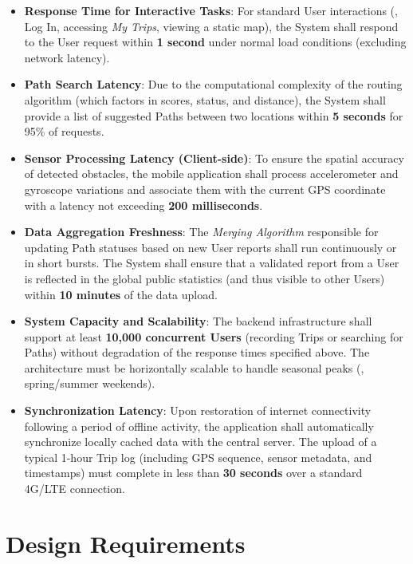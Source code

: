 \begin{itemize}
    \item \textbf{Response Time for Interactive Tasks}: 
    For standard User interactions (\eg, Log In, accessing \emph{My Trips}, viewing a static map), the System shall respond to the User request within \textbf{1 second} under normal load conditions (excluding network latency).

    \item \textbf{Path Search Latency}: 
    Due to the computational complexity of the routing algorithm (which factors in scores, status, and distance), the System shall provide a list of suggested Paths between two locations within \textbf{5 seconds} for 95\% of requests.

    \item \textbf{Sensor Processing Latency (Client-side)}: 
    To ensure the spatial accuracy of detected obstacles, the mobile application shall process accelerometer and gyroscope variations and associate them with the current GPS coordinate with a latency not exceeding \textbf{200 milliseconds}.

    \item \textbf{Data Aggregation Freshness}: 
    The \emph{Merging Algorithm} responsible for updating Path statuses based on new User reports shall run continuously or in short bursts. The System shall ensure that a validated report from a User is reflected in the global public statistics (and thus visible to other Users) within \textbf{10 minutes} of the data upload.

    \item \textbf{System Capacity and Scalability}: 
    The backend infrastructure shall support at least \textbf{10,000 concurrent Users} (recording Trips or searching for Paths) without degradation of the response times specified above. The architecture must be horizontally scalable to handle seasonal peaks (\eg, spring/summer weekends).

    \item \textbf{Synchronization Latency}: 
    Upon restoration of internet connectivity following a period of offline activity, the application shall automatically synchronize locally cached data with the central server. The upload of a typical 1-hour Trip log (including GPS sequence, sensor metadata, and timestamps) must complete in less than \textbf{30 seconds} over a standard 4G/LTE connection.
\end{itemize}

\section{Design Requirements}
